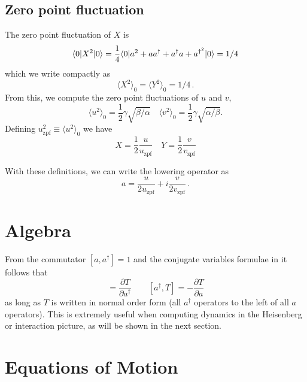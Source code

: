 \subsection{Zero point fluctuation}

The zero point fluctuation of $X$ is
\begin{equation}
\langle 0 | X^2 | 0 \rangle = \frac{1}{4}\langle 0 | a^2 + aa^{\dagger} + a^{\dagger}a + a^{\dagger^2} | 0 \rangle = 1/4
\end{equation}
which we write compactly as
\begin{equation}
\langle X^2 \rangle_0 = \langle Y^2 \rangle_0 = 1/4 \, .
\end{equation}
From this, we compute the zero point fluctuations of $u$ and $v$, \begin{equation}
\langle u^2 \rangle_0 = \frac{1}{2}\gamma \sqrt{\beta / \alpha} \quad \langle v^2 \rangle_0 = \frac{1}{2}\gamma \sqrt{\alpha / \beta} . \end{equation}
Defining $u_{\textrm{zpf}}^2 \equiv \langle u^2 \rangle_0 $ we have \begin{equation}
X = \frac{1}{2}\frac{u}{u_{\textrm{zpf}}} \quad Y = \frac{1}{2}\frac{v}{v_{\textrm{zpf}}} \end{equation}

With these definitions, we can write the lowering operator as
\begin{equation}
a = \frac{u}{2 u_\text{zpf}} + i \frac{v}{2 v_\text{zpf}} \, .
\end{equation}

\section{Algebra}

From the commutator $ [a,a^{\dagger}]=1 $ and the conjugate variables formulae in \citeinternaltype {} it follows that \begin{equation}
[a,T] = \frac{\partial T}{\partial a^{\dagger}} \qquad [a^{\dagger},T] = -\frac{\partial T}{\partial a}\end{equation}
as long as $T$ is written in normal order form (all $a^{\dagger}$ operators to the left of all $a$ operators).
This is extremely useful when computing dynamics in the Heisenberg or interaction picture, as will be shown in the next section.

\section{Equations of Motion}

